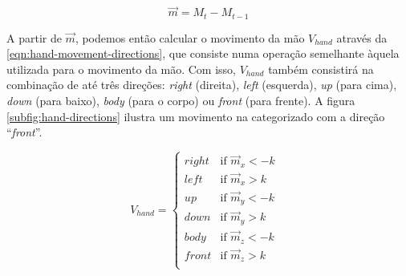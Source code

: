 \begin{enumerate}
          \begin{equation}
              \label{eqn:hand-movement}
              \overrightarrow{m} = M_{t} - M_{t-1}
          \end{equation}

          A partir de \(\overrightarrow{m}\), podemos então calcular o movimento da mão \(V_{hand}\) através da \autoref{eqn:hand-movement-directions}, que consiste numa operação semelhante àquela utilizada para o movimento da mão.
          Com isso, \(V_{hand}\) também consistirá na combinação de até três direções: \textit{right} (direita), \textit{left} (esquerda), \textit{up} (para cima), \textit{down} (para baixo), \textit{body} (para o corpo) ou \textit{front} (para frente).
          A figura \autoref{subfig:hand-directions} ilustra um movimento na categorizado com a direção ``\textit{front}''.


          \begin{equation}
              \label{eqn:hand-movement-directions}
              V_{hand} =
              \begin{cases}
                  right & \text{if $\overrightarrow{m}_x < {-k}$ } \\
                  left  & \text{if $\overrightarrow{m}_x > {k}$ }  \\
                  up    & \text{if $\overrightarrow{m}_y < {-k}$ } \\
                  down  & \text{if $\overrightarrow{m}_y > {k}$ }  \\
                  body  & \text{if $\overrightarrow{m}_z < {-k}$ } \\
                  front & \text{if $\overrightarrow{m}_z > {k}$ }  \\
              \end{cases}
          \end{equation}


\end{enumerate}
